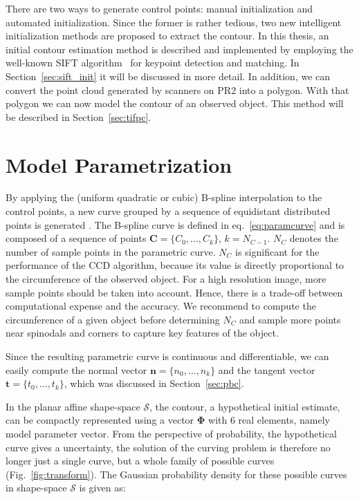 There are two ways to generate control points:
manual initialization and automated initialization. 
Since the former is rather tedious, two new
intelligent initialization methods are proposed to extract the
contour.
In this thesis, an initial contour estimation method is described and
implemented by employing the well-known SIFT algorithm~\cite{lowe2004distinctive} for
keypoint detection and matching. In Section~\ref{sec:sift_init} it will be discussed in
more detail. In addition, we can convert the point cloud generated
by scanners on PR2 into a polygon. With that polygon we can now model the contour
of an observed object. This method will be described in Section~\ref{sec:tifpc}.

\section{Model Parametrization}
\label{sec:mp}

By applying the (uniform quadratic or cubic) B-spline interpolation to the control points, a new curve
grouped by a sequence of equidistant distributed points is generated
. The B-spline curve is defined in eq.~\ref{eq:paramcurve} and is
composed of a sequence of points $\mathbf{C} = \{C_0, \ldots,
C_{k}\}$, $k = N_{C-1}$. $N_C$ denotes the number of sample points in the
parametric curve. $N_C$ is significant for the
performance of the CCD algorithm, because its value is directly
proportional to the circumference of the observed object. For a high
resolution image, more sample points should be taken into account.
Hence, there is a trade-off between computational expense and the
accuracy. We recommend to compute the circumference of a given object before
determining $N_C$ and sample more points near spinodals and corners to
capture key features of the object.

Since the resulting parametric curve is continuous and
differentiable, we can easily compute the normal vector $\mathbf{n} = \{n_0, \ldots,
n_{k}\}$ and the tangent vector $\mathbf{t} = \{t_0, \ldots, t_{k}\}$,
 which was discussed in Section~\ref{sec:pbc}. 

In the planar affine shape-space $\mathcal{S}$, the contour, a
hypothetical initial estimate, can be compactly represented using a
vector $\mathbf{\Phi}$ with 6 real elements, namely model
parameter vector. From the perspective of probability, the hypothetical
curve gives a uncertainty, the solution of the curving problem is
therefore no longer just a single curve, but a whole family of
possible curves (Fig.~\ref{fig:transform}). The Gaussian probability density for these possible
curves in shape-space $\mathcal{S}$ is given as:

